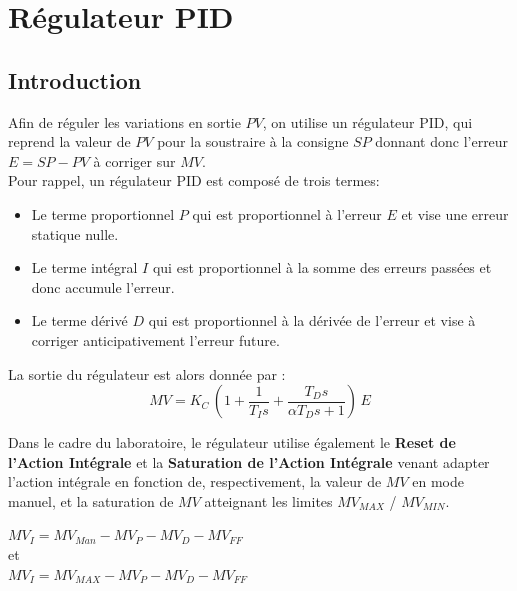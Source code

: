 \section{Régulateur PID}

\subsection{Introduction}
Afin de réguler les variations en sortie $PV$, on utilise un régulateur PID, qui reprend la valeur de $PV$ pour la soustraire à la consigne $SP$ donnant donc l'erreur $E = SP - PV$ à corriger sur $MV$.\\
Pour rappel, un régulateur PID est composé de trois termes:
\begin{itemize}
    \item Le terme proportionnel $P$ qui est proportionnel à l'erreur $E$ et vise une erreur statique nulle.
    \item Le terme intégral $I$ qui est proportionnel à la somme des erreurs passées et donc accumule l'erreur.
    \item Le terme dérivé $D$ qui est proportionnel à la dérivée de l'erreur et vise à corriger anticipativement l'erreur future.
\end{itemize}
La sortie du régulateur est alors donnée par :
\begin{equation}
    MV = K_C \, \left( 1 + \frac{1}{T_I s} + \frac{T_D s}{\alpha T_D s + 1}\right) \, E
\end{equation}

Dans le cadre du laboratoire, le régulateur utilise également le \textbf{Reset de l'Action Intégrale} et la \textbf{Saturation de l'Action Intégrale} venant adapter l'action intégrale en fonction de, respectivement, la valeur de $MV$ en mode manuel, et la saturation de $MV$ atteignant les limites $MV_{MAX}$ / $MV_{MIN}$.
\begin{center}
    $MV_I = MV_{Man} - MV_P - MV_D - MV_{FF}$\\[4pt]
    et\\[4pt]
    $MV_I = MV_{MAX} - MV_P - MV_D - MV_{FF}$
\end{center}

